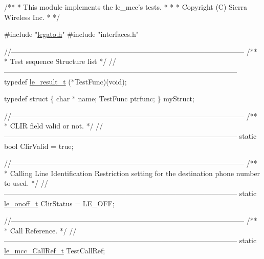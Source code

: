 
\begin{DoxyCodeInclude}
\textcolor{comment}{ /**}
\textcolor{comment}{  * This module implements the le\_mcc's tests.}
\textcolor{comment}{  *}
\textcolor{comment}{  *}
\textcolor{comment}{  * Copyright (C) Sierra Wireless Inc.}
\textcolor{comment}{  *}
\textcolor{comment}{  */}

\textcolor{preprocessor}{#include "\hyperlink{legato_8h}{legato.h}"}
\textcolor{preprocessor}{#include "interfaces.h"}


\textcolor{comment}{//--------------------------------------------------------------------------------------------------}\textcolor{comment}{}
\textcolor{comment}{/**}
\textcolor{comment}{ * Test sequence Structure list}
\textcolor{comment}{ */}
\textcolor{comment}{//--------------------------------------------------------------------------------------------------}
\textcolor{keyword}{typedef} \hyperlink{le__basics_8h_a1cca095ed6ebab24b57a636382a6c86c}{le\_result\_t} (*TestFunc)(void);

\textcolor{keyword}{typedef} \textcolor{keyword}{struct}
\{
        \textcolor{keywordtype}{char} * name;
        TestFunc ptrfunc;
\} myStruct;

\textcolor{comment}{//--------------------------------------------------------------------------------------------------}\textcolor{comment}{}
\textcolor{comment}{/**}
\textcolor{comment}{ * CLIR field valid or not.}
\textcolor{comment}{ */}
\textcolor{comment}{//--------------------------------------------------------------------------------------------------}
\textcolor{keyword}{static} \textcolor{keywordtype}{bool} ClirValid = \textcolor{keyword}{true};

\textcolor{comment}{//--------------------------------------------------------------------------------------------------}\textcolor{comment}{}
\textcolor{comment}{/**}
\textcolor{comment}{ * Calling Line Identification Restriction setting for the destination phone number to used.}
\textcolor{comment}{ */}
\textcolor{comment}{//--------------------------------------------------------------------------------------------------}
\textcolor{keyword}{static} \hyperlink{le__basics_8h_ae2138c90c41d30e2d510be01d8b374da}{le\_onoff\_t} ClirStatus = LE\_OFF;

\textcolor{comment}{//--------------------------------------------------------------------------------------------------}\textcolor{comment}{}
\textcolor{comment}{/**}
\textcolor{comment}{ * Call Reference.}
\textcolor{comment}{ */}
\textcolor{comment}{//--------------------------------------------------------------------------------------------------}
\textcolor{keyword}{static} \hyperlink{le__mcc__interface_8h_a8ae6dac3ca12854884d63e17d5388a7a}{le\_mcc\_CallRef\_t} TestCallRef;


\end{DoxyCodeInclude}
